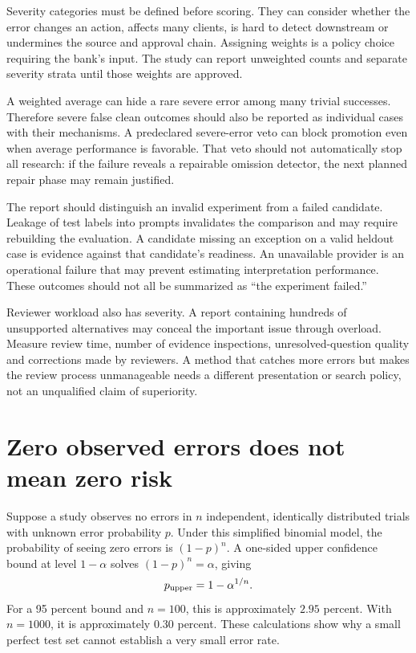 \documentclass[12pt,a4paper,oneside,openany]{book}
\begin{document}
Severity categories must be defined before scoring. They can consider whether the
error changes an action, affects many clients, is hard to detect downstream or
undermines the source and approval chain. Assigning weights is a policy choice
requiring the bank's input. The study can report unweighted counts and separate
severity strata until those weights are approved.

A weighted average can hide a rare severe error among many trivial successes.
Therefore severe false clean outcomes should also be reported as individual cases
with their mechanisms. A predeclared severe-error veto can block promotion even
when average performance is favorable. That veto should not automatically stop
all research: if the failure reveals a repairable omission detector, the next
planned repair phase may remain justified.

The report should distinguish an invalid experiment from a failed candidate.
Leakage of test labels into prompts invalidates the comparison and may require
rebuilding the evaluation. A candidate missing an exception on a valid heldout
case is evidence against that candidate's readiness. An unavailable provider is
an operational failure that may prevent estimating interpretation performance.
These outcomes should not all be summarized as ``the experiment failed.''

Reviewer workload also has severity. A report containing hundreds of unsupported
alternatives may conceal the important issue through overload. Measure review
time, number of evidence inspections, unresolved-question quality and corrections
made by reviewers. A method that catches more errors but makes the review process
unmanageable needs a different presentation or search policy, not an unqualified
claim of superiority.

\section{Zero observed errors does not mean zero risk}
\label{merge:M09:07}


Suppose a study observes no errors in $n$ independent, identically distributed
trials with unknown error probability $p$. Under this simplified binomial model,
the probability of seeing zero errors is $(1-p)^n$. A one-sided upper confidence
bound at level $1-\alpha$ solves $(1-p)^n=\alpha$, giving
\begin{equation}
 p_{\rm upper}=1-\alpha^{1/n}.
 \label{eq:zero-errors}
\end{equation}
For a 95 percent bound and $n=100$, this is approximately $2.95$ percent. With
$n=1000$, it is approximately $0.30$ percent. These calculations show why a small
perfect test set cannot establish a very small error rate.
\end{document}
